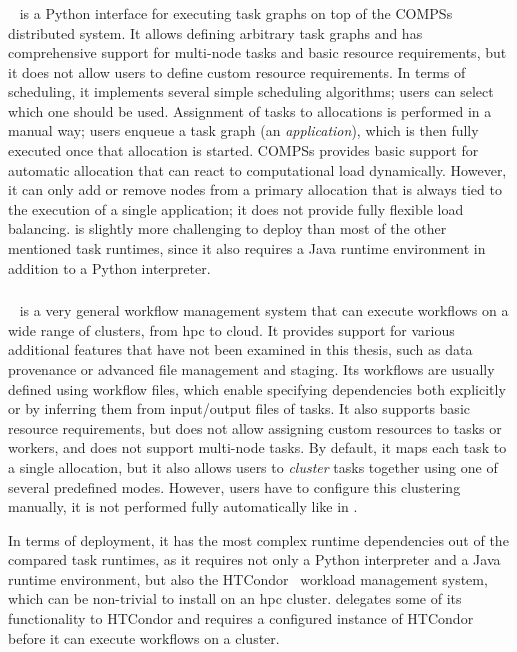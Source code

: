 \subsubsection*{\pycompss}
\pycompss~\cite{pycompss} is a Python interface for executing task graphs on top of the
COMPSs distributed system. It allows defining arbitrary task graphs and has comprehensive support
for multi-node tasks and basic resource requirements, but it does not allow users to define custom
resource requirements. In terms of scheduling, it implements several simple scheduling algorithms;
users can select which one should be used. Assignment of tasks to allocations is performed in a
manual way; users enqueue a task graph (an \emph{application}), which is then fully executed
once that allocation is started. COMPSs provides basic support for automatic allocation that can
react to computational load dynamically. However, it can only add or remove nodes from a primary
allocation that is always tied to the execution of a single application; it does not provide fully
flexible load balancing. \pycompss is slightly more challenging to deploy than most of the other
mentioned task runtimes, since it also requires a Java runtime environment in addition to a Python
interpreter.

\subsubsection*{\pegasus}
\pegasus~\cite{pegasus} is a very general workflow management system that can execute
workflows on a wide range of clusters, from \gls{hpc} to cloud. It provides support
for various additional features that have not been examined in this thesis, such as data provenance
or advanced file management and staging. Its workflows are usually defined using workflow files,
which enable specifying dependencies both explicitly or by inferring them from input/output files
of tasks. It also supports basic resource requirements, but does not allow assigning custom
resources to tasks or workers, and does not support multi-node tasks. By default, it maps each task
to a single allocation, but it also allows users to \emph{cluster} tasks together using
one of several predefined modes. However, users have to configure this clustering manually, it is
not performed fully automatically like in \hyperqueue{}.

In terms of deployment, it has the most complex runtime dependencies out of the compared task
runtimes, as it requires not only a Python interpreter and a Java runtime environment, but also the
HTCondor~\cite{htcondor} workload management system, which can be non-trivial to install on
an \gls{hpc} cluster. \pegasus{} delegates some of its functionality to
HTCondor and requires a configured instance of HTCondor before it can execute workflows on a
cluster.

